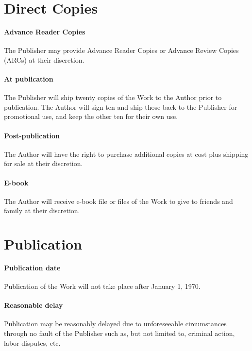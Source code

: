 \documentclass[12pt,letterpaper]{article}
\def\PublicationDate{January 1, 1970}
\begin{document}
\section{Direct Copies}

\paragraph{Advance Reader Copies} The Publisher may provide Advance Reader Copies or Advance Review Copies (ARCs) at their discretion.

\paragraph{At publication} The Publisher will ship twenty copies of the Work to the Author prior to publication. The Author will sign ten and ship those back to the Publisher for promotional use, and keep the other ten for their own use.

\paragraph{Post-publication} The Author will have the right to purchase additional copies at cost plus shipping for sale at their discretion.

\paragraph{E-book} The Author will receive e-book file or files of the Work to give to friends and family at their discretion.

\section{Publication}

\paragraph{Publication date}

Publication of the Work will not take place after \PublicationDate.

\paragraph{Reasonable delay}

Publication may be reasonably delayed due to unforeseeable circumstances through no fault of the Publisher such as, but not limited to, criminal action, labor disputes, etc.
\end{document}
